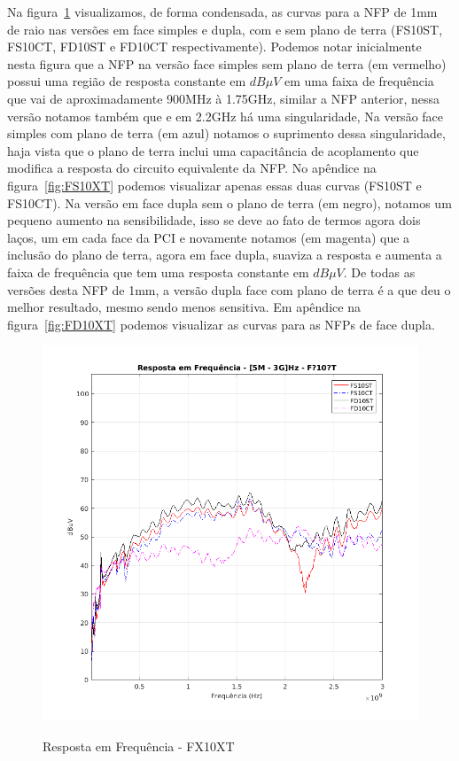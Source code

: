 Na figura~\ref{fig:FX10XT} visualizamos, de forma condensada, as curvas para a NFP de 1mm de raio nas versões em face simples e dupla, com e sem plano de terra (FS10ST, FS10CT, FD10ST e FD10CT respectivamente). Podemos notar inicialmente nesta figura que a NFP na versão face simples sem plano de terra (em vermelho) possui uma região de resposta constante em $dB \mu V$ em uma faixa de frequência que vai de aproximadamente 900MHz à 1.75GHz, similar a NFP anterior, nessa versão notamos também que e em 2.2GHz há uma singularidade, %
Na versão face simples com plano de terra (em azul) notamos o suprimento dessa singularidade, haja vista que o plano de terra inclui uma capacitância de acoplamento que modifica a resposta do circuito equivalente da NFP. No apêndice na figura~\ref{fig:FS10XT} podemos visualizar apenas essas duas curvas (FS10ST e FS10CT). Na versão em face dupla sem o plano de terra (em negro), notamos um pequeno aumento na sensibilidade, isso se deve ao fato de termos agora dois laços, um em cada face da PCI e novamente notamos (em magenta) que a inclusão do plano de terra, agora em face dupla, suaviza a resposta e aumenta a faixa de frequência que tem uma resposta constante em $dB \mu V$. De todas as versões desta NFP de 1mm, a versão dupla face com plano de terra é a que deu o melhor resultado, mesmo sendo menos sensitiva. Em apêndice na figura~\ref{fig:FD10XT} podemos visualizar as curvas para as NFPs de face dupla.
\begin{figure}[htb!]
	\centering 
	\caption{Resposta em Frequência - FX10XT}
	\includegraphics[scale=0.7]{./img/FX10XT}
	\label{fig:FX10XT}
\end{figure} 

